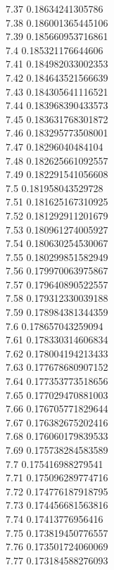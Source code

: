 {7.37	0.18634241305786\\
7.38	0.186001365445106\\
7.39	0.185660953716861\\
7.4	0.185321176644606\\
7.41	0.184982033002353\\
7.42	0.184643521566639\\
7.43	0.184305641116521\\
7.44	0.183968390433573\\
7.45	0.183631768301872\\
7.46	0.183295773508001\\
7.47	0.18296040484104\\
7.48	0.182625661092557\\
7.49	0.182291541056608\\
7.5	0.181958043529728\\
7.51	0.181625167310925\\
7.52	0.181292911201679\\
7.53	0.180961274005927\\
7.54	0.180630254530067\\
7.55	0.180299851582949\\
7.56	0.179970063975867\\
7.57	0.179640890522557\\
7.58	0.179312330039188\\
7.59	0.178984381344359\\
7.6	0.178657043259094\\
7.61	0.178330314606834\\
7.62	0.178004194213433\\
7.63	0.177678680907152\\
7.64	0.177353773518656\\
7.65	0.177029470881003\\
7.66	0.176705771829644\\
7.67	0.176382675202416\\
7.68	0.176060179839533\\
7.69	0.175738284583589\\
7.7	0.175416988279541\\
7.71	0.175096289774716\\
7.72	0.174776187918795\\
7.73	0.174456681563816\\
7.74	0.17413776956416\\
7.75	0.173819450776557\\
7.76	0.173501724060069\\
7.77	0.173184588276093\\
}
